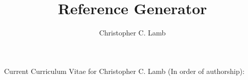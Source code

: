 \documentclass[10pt,letterpaper]{article}
\author{Christopher C. Lamb}
\title{Reference Generator}
\begin{document}
Current Curriculum Vitae for Christopher C. Lamb (In order of authorship): \\~\\
\cite{IJCLOSER:Lamb}
\cite{book:lamb}
\cite{6274040}
\cite{Lamb:2011:DSL:2046631.2046641}
\cite{ctrl:lamb-SOSE}
\cite{6008751}
\cite{Jamkhedkar:2010:IUM:1866870.1866885}



\end{document}
